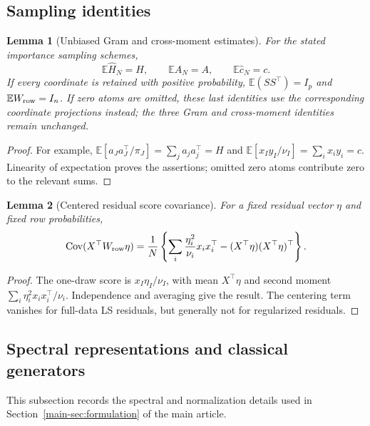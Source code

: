 \documentclass[11pt,a4paper,leqno]{article}
\numberwithin{equation}{section}
\numberwithin{figure}{section}
\numberwithin{table}{section}
\theoremstyle{plain}
\newtheorem{lemma}{Lemma}[section]
\theoremstyle{definition}
\theoremstyle{remark}
\newcommand{\E}{\mathbb E}
\begin{document}
\subsection{Sampling identities}\label{sec:sampling_identities}
\begin{lemma}[Unbiased Gram and cross-moment estimates]
\label{lem:sampling_weight_unbiasedness}
For the stated importance sampling schemes,
\[
 \E\widehat H_N=H,\qquad \E\widehat A_N=A,\qquad
 \E\widehat c_N=c.
\]
If every coordinate is retained with positive probability,
$\E(SS^\top)=I_p$ and $\E W_{\rm row}=I_n$.
If zero atoms are omitted, these last identities use the corresponding
coordinate projections instead; the three Gram and cross-moment identities
remain unchanged.
\end{lemma}
\begin{proof}
For example,
$\E[a_{J}a_{J}^\top/\pi_J]=\sum_j a_ja_j^\top=H$ and
$\E[x_Iy_I/\nu_I]=\sum_i x_iy_i=c$.
Linearity of expectation proves the assertions; omitted zero atoms
contribute zero to the relevant sums.
\end{proof}

\begin{lemma}[Centered residual score covariance]
\label{lem:row_residual_score_variance}
For a fixed residual vector $\eta$ and fixed row probabilities,
\[
 \operatorname{Cov}(X^\top W_{\rm row}\eta)
 =\frac1N\left\{\sum_i\frac{\eta_i^2}{\nu_i}x_ix_i^\top
                 -(X^\top\eta)(X^\top\eta)^\top\right\}.
\]
\end{lemma}
\begin{proof}
The one-draw score is $x_I\eta_I/\nu_I$, with mean $X^\top\eta$
and second moment $\sum_i\eta_i^2x_ix_i^\top/\nu_i$.
Independence and averaging give the result. The centering term vanishes
for full-data LS residuals, but generally not for regularized residuals.
\end{proof}

\subsection{Spectral representations and classical generators}
\label{supp:sec:classical_generators}
This subsection records the spectral and normalization details used in
Section~\ref{main-sec:formulation} of the main article.
\end{document}
